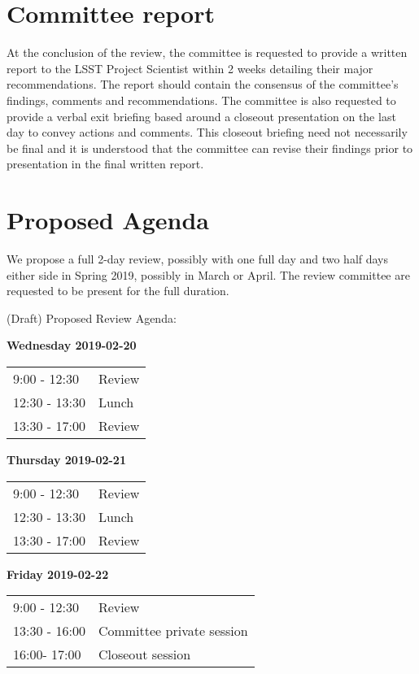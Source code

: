 \documentclass[DM,lsstdraft,STS,toc]{lsstdoc}
\begin{document}
\section{Committee report}
At the conclusion of the review, the committee is requested to provide a written report  to the LSST Project Scientist within 2 weeks  detailing
their major recommendations.  The report should contain the consensus of the committee's findings, comments and recommendations. The committee is also requested to
provide a verbal exit briefing based around a closeout presentation on the last day to convey actions and comments. This closeout briefing need not
necessarily be final and it is understood that the committee can revise their findings prior to presentation in the final written report.

\section{Proposed Agenda}
We propose a full 2-day review, possibly with one full day and two half days either side in Spring 2019, possibly in March or April.
The review committee are requested to be present for the full duration.

(Draft) Proposed Review Agenda:

\textbf{Wednesday 2019-02-20} \\
\begin{tabular}[htb]{l l}
9:00 - 12:30 & Review \\
12:30 - 13:30 & Lunch \\
13:30 - 17:00 & Review \\
\end{tabular}

\textbf{Thursday 2019-02-21} \\
\begin{tabular}[htb]{l l}
9:00 - 12:30 & Review \\
12:30 - 13:30 & Lunch \\
13:30 - 17:00 & Review \\
\end{tabular}

\textbf{Friday 2019-02-22} \\
\begin{tabular}[htb]{l l}
9:00 - 12:30 & Review \\
13:30 - 16:00 &Committee private session \\
16:00- 17:00 & Closeout session\\
\end{tabular}

\clearpage
\end{document}
